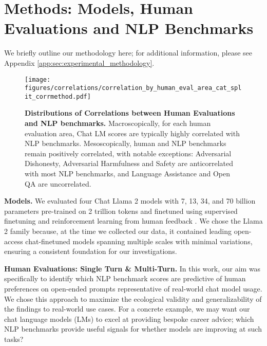 \section{Methods: Models, Human Evaluations and NLP Benchmarks}
\label{sec:methods}

We briefly outline our methodology here; for additional information, please see Appendix \ref{app:sec:experimental_methodology}.

\begin{figure*}[t!]
    \centering
    \texttt{[image: figures/correlations/correlation\_by\_human\_eval\_area\_cat\_split\_corrmethod.pdf]}
    \caption{\textbf{Distributions of Correlations between Human Evaluations and NLP benchmarks.} Macroscopically, for each human evaluation area, Chat LM scores are typically highly correlated with NLP benchmarks. Mesoscopically, human and NLP benchmarks remain positively correlated, with notable exceptions: Adversarial Dishonesty, Adversarial Harmfulness and Safety are anticorrelated with most NLP benchmarks, and Language Assistance and Open QA are uncorrelated.}
    \label{fig:corr:human_eval_area}
\end{figure*}

\textbf{Models.} We evaluated four Chat Llama 2 models with 7, 13, 34, and 70 billion parameters pre-trained on 2 trillion tokens and finetuned using supervised finetuning \citep{sanh2021multitask, chung2022scaling, longpre2023flan} and reinforcement learning from human feedback \citep{christiano2017deep, ziegler2019fine, stiennon2020learning}.
We chose the Llama 2 family because, at the time we collected our data, it contained leading open-access chat-finetuned models spanning multiple scales with minimal variations, ensuring a consistent foundation for our investigations.

\textbf{Human Evaluations: Single Turn \& Multi-Turn.} In this work, our aim was specifically to identify which NLP benchmark scores are predictive of human preferences on open-ended prompts representative of real-world chat model usage. We chose this approach to maximize the ecological validity and generalizability of the findings to real-world use cases. For a concrete example, we may want our chat language models (LMs) to excel at providing bespoke career advice; which NLP benchmarks provide useful signals for whether models are improving at such tasks? 




